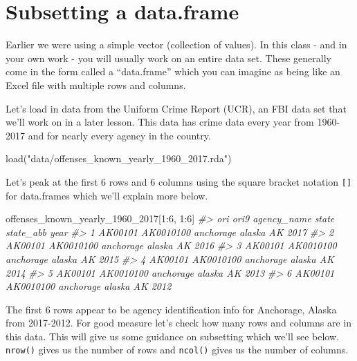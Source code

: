 \documentclass[
]{krantz}
\makeatletter
\newenvironment{Shaded}{\begin{snugshade}}{\end{snugshade}}
\newcommand{\CommentTok}[1]{\textcolor[rgb]{0.37,0.37,0.37}{\textit{#1}}}
\newcommand{\DecValTok}[1]{\textcolor[rgb]{0.06,0.06,0.06}{#1}}
\newcommand{\FunctionTok}[1]{\textcolor[rgb]{0,0,0}{#1}}
\newcommand{\NormalTok}[1]{#1}
\newcommand{\SpecialCharTok}[1]{\textcolor[rgb]{0,0,0}{#1}}
\newcommand{\StringTok}[1]{\textcolor[rgb]{0.5,0.5,0.5}{#1}}
\newenvironment{kframe}{%
\medskip{}
\setlength{\fboxsep}{.8em}
 \def\at@end@of@kframe{}%
 \ifinner\ifhmode%
  \def\at@end@of@kframe{\end{minipage}}%
  \begin{minipage}{\columnwidth}%
 \fi\fi%
 \def\FrameCommand##1{\hskip\@totalleftmargin \hskip-\fboxsep
 \colorbox{shadecolor}{##1}\hskip-\fboxsep
     \hskip-\linewidth \hskip-\@totalleftmargin \hskip\columnwidth}%
 \MakeFramed {\advance\hsize-\width
   \@totalleftmargin\z@ \linewidth\hsize
   \@setminipage}}%
 {\par\unskip\endMakeFramed%
 \at@end@of@kframe}
\renewenvironment{Shaded}{\begin{kframe}}{\end{kframe}}
\makeatother
\begin{document}
\hypertarget{subsetting-a-data.frame}{%
\section{Subsetting a data.frame}\label{subsetting-a-data.frame}}

Earlier we were using a simple vector (collection of values). In this class - and in your own work - you will usually work on an entire data set. These generally come in the form called a ``data.frame'' which you can imagine as being like an Excel file with multiple rows and columns.

Let's load in data from the Uniform Crime Report (UCR), an FBI data set that we'll work on in a later lesson. This data has crime data every year from 1960-2017 and for nearly every agency in the country.

\begin{Shaded}
\begin{Highlighting}[]
\FunctionTok{load}\NormalTok{(}\StringTok{"data/offenses\_known\_yearly\_1960\_2017.rda"}\NormalTok{)}
\end{Highlighting}
\end{Shaded}

Let's peak at the first 6 rows and 6 columns using the square bracket notation \texttt{{[}{]}} for data.frames which we'll explain more below.

\begin{Shaded}
\begin{Highlighting}[]
\NormalTok{offenses\_known\_yearly\_1960\_2017[}\DecValTok{1}\SpecialCharTok{:}\DecValTok{6}\NormalTok{, }\DecValTok{1}\SpecialCharTok{:}\DecValTok{6}\NormalTok{]}
\CommentTok{\#\textgreater{}       ori      ori9 agency\_name  state state\_abb year}
\CommentTok{\#\textgreater{} 1 AK00101 AK0010100   anchorage alaska        AK 2017}
\CommentTok{\#\textgreater{} 2 AK00101 AK0010100   anchorage alaska        AK 2016}
\CommentTok{\#\textgreater{} 3 AK00101 AK0010100   anchorage alaska        AK 2015}
\CommentTok{\#\textgreater{} 4 AK00101 AK0010100   anchorage alaska        AK 2014}
\CommentTok{\#\textgreater{} 5 AK00101 AK0010100   anchorage alaska        AK 2013}
\CommentTok{\#\textgreater{} 6 AK00101 AK0010100   anchorage alaska        AK 2012}
\end{Highlighting}
\end{Shaded}

The first 6 rows appear to be agency identification info for Anchorage, Alaska from 2017-2012. For good measure let's check how many rows and columns are in this data. This will give us some guidance on subsetting which we'll see below. \texttt{nrow()} gives us the number of rows and \texttt{ncol()} gives us the number of columns.
\end{document}
